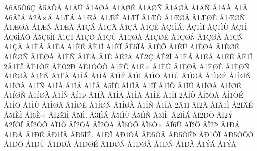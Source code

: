 {^^c56^^c45^^d56^^c7
^^c55^^c4^^d6^^c5
^^c51^^c4^^d9
^^c51^^c4^^d8^^c5
^^c51^^c4^^d8^^c9
^^c51^^c4^^d8^^d1
^^c51^^c4^^d8^^c0
^^c51^^c4^^d1
^^c51^^c4^^c0
^^c51^^c5
^^c56^^c5^^cd^^c1
^^c52^^c5^^d7^^c1
^^c51^^c6^^c1
^^c51^^c6^^c5
^^c51^^c6^^c9
^^c51^^c6^^cf
^^c51^^c6^^d5
^^c51^^c6^^d8^^c5
^^c51^^c6^^d8^^c9
^^c51^^c6^^d8^^d1
^^c51^^c6^^d8^^c0
^^c51^^c6^^d1
^^c51^^c6^^c0
^^c51^^c7^^c1
^^c51^^c7^^c4
^^c51^^c7^^c5
^^c51^^c7^^c9
^^c5^^c71^^cc^^c1.
^^c5^^c71^^cc^^cf
^^c5^^c71^^cc^^d9
^^c5^^c71^^ce
^^c5^^c76^^ce^^c1^^d4
^^c55^^c76^^ce^^cf
^^c51^^c7^^cf
^^c51^^c7^^d5
^^c51^^c7^^d9
^^c51^^c7^^d8^^c5
^^c51^^c7^^d8^^c9
^^c51^^c7^^d8^^d1
^^c51^^c7^^d8^^c0
^^c51^^c7^^d1
^^c51^^c7^^c0
^^c51^^c8^^c1
^^c51^^c8^^c5
^^c51^^c8^^c9
^^c5^^c81^^cd
^^c51^^c8^^cf
^^c5^^c85^^cf^^c2
^^c51^^c8^^d5
^^c51^^c8^^d9
^^c51^^c8^^d8^^c5
^^c51^^c8^^d8^^c9
^^c51^^c8^^d8^^d1
^^c51^^c8^^d8^^c0
^^c51^^c8^^d1
^^c51^^c8^^c0
^^c51^^c9
^^c5^^c92^^c4
^^c5^^c92^^c7
^^c5^^c92^^cd
^^c51^^cb^^c1
^^c51^^cb^^c5
^^c51^^cb^^c9
^^c5^^cb1^^ce
2^^c51^^cb^^cf
^^c5^^cb1^^d3^^cb
^^c5^^cb^^d32^^d0
^^c5^^cb1^^d3^^d4^^d5
^^c51^^cb^^d5
^^c51^^cb^^d7
^^c51^^cb^^d9
^^c51^^cb^^d8^^c5
^^c51^^cb^^d8^^c9
^^c51^^cb^^d8^^d1
^^c51^^cb^^d8^^c0
^^c51^^cb^^d1
^^c51^^cb^^c0
^^c51^^cc^^c1
^^c51^^cc^^c5
^^c51^^cc^^c9
^^c51^^cc^^cf
^^c51^^cc^^d5
^^c51^^cc^^d9
^^c51^^cc^^d8^^c5
^^c51^^cc^^d8^^c9
^^c51^^cc^^d8^^d1
^^c51^^cc^^d8^^c0
^^c51^^cc^^d1
^^c51^^cc^^c0
^^c51^^cd^^c1
^^c51^^cd^^c5
^^c55^^cd^^c9
^^c5^^cd1^^ce^^c5
^^c51^^cd^^cf
^^c51^^cd^^d5
^^c51^^cd^^d9
^^c51^^cd^^d8^^c5
^^c51^^cd^^d8^^c9
^^c51^^cd^^d8^^d1
^^c51^^cd^^d8^^c0
^^c51^^cd^^d1
^^c5^^cd1^^de
^^c51^^cd^^c0
^^c51^^ce^^c1
^^c51^^ce^^c5
^^c51^^ce^^c9
^^c51^^ce^^cf
2^^c5^^ce^^d2
^^c5^^ce5^^d2^^c5
^^c5^^ce1^^d2^^c9
^^c51^^ce^^d5
^^c51^^ce^^d9
^^c51^^ce^^d8^^c5
^^c51^^ce^^d8^^c9
^^c51^^ce^^d8^^d1
^^c51^^ce^^d8^^c0
^^c51^^ce^^d1
^^c51^^ce^^c0
2^^c51^^cf
^^c5^^cf2^^c2
^^c5^^cf^^c21^^cc
^^c52^^cf^^c4^^c9
^^c55^^cf^^c8^^cc
^^c5^^cf6^^c8^^d7
^^c5^^cf2^^cb^^cf^^ce
^^c55^^cf^^cc.
^^c53^^cf^^cc^^c1
^^c55^^cf^^cc^^d9
^^c55^^cf^^cc^^d1
^^c53^^cf^^ce.
^^c52^^cf^^ce^^c1
^^c5^^cf2^^d0^^d2
^^c5^^cf2^^dd
^^c52^^cf^^d2^^cf
^^c5^^cf2^^d2^^d5
^^c5^^cf1^^d3
^^c5^^cf2^^d3^^c1
^^c5^^cf2^^d3^^c5
^^c5^^cf6^^d3^^d5
^^c5^^cf6^^d3^^d7
^^c5^^cf6^^db
^^c5^^cf2^^d6
^^c5^^cf2^^de
^^c51^^d0^^c1
^^c51^^d0^^c5
^^c51^^d0^^c9
^^c5^^d01^^cc^^c5
^^c5^^d05^^cc^^c9.
^^c51^^d0^^cf
^^c5^^d01^^d4^^c1
^^c5^^d05^^d4^^c5
^^c5^^d05^^d4^^c9^^de
^^c5^^d01^^d4^^cf
^^c5^^d05^^d4^^d5^^d2
^^c51^^d0^^d5
^^c51^^d0^^d9
^^c51^^d0^^d8^^c5
^^c51^^d0^^d8^^c9
^^c51^^d0^^d8^^d1
^^c51^^d0^^d8^^c0
^^c51^^d0^^d1
^^c51^^d0^^c0
^^c51^^dd^^c1
^^c51^^dd^^c5
}
